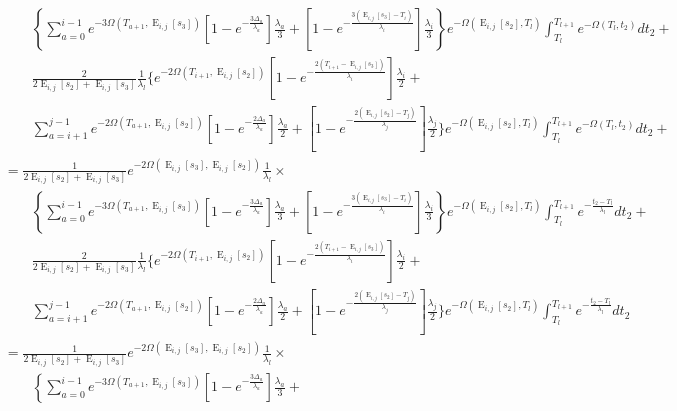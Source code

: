 \documentclass{article}
\DeclareMathOperator{\E}{E}
\begin{document}
\begin{align*}
    &\qquad\left\{\sum_{a=0}^{i-1}e^{-3\Omega(T_{a+1},\E_{i,j}[s_3])}
        \left[1-e^{-\frac{3\Delta_a}{\lambda_a}}\right]\frac{\lambda_a}{3}+
    \left[1-e^{-\frac{3\left(\E_{i,j}[s_3]-T_i\right)}{\lambda_i}}\right]
    \frac{\lambda_i}{3}\right\}
    e^{-\Omega(\E_{i,j}[s_2], T_l)}\int_{T_l}^{T_{l+1}}e^{-\Omega(T_l,t_2)}dt_2+\\
    &\qquad
        \frac{2}{2\E_{i,j}[s_2]+\E_{i,j}[s_3]}\frac{1}{\lambda_l}\Bigg\{e^{-2\Omega(T_{i+1},\E_{i,j}[s_2])}\left[1-e^{-\frac{2\left(T_{i+1}-\E_{i,j}[s_3]\right)}{\lambda_i}}\right]\frac{\lambda_i}{2}+\\
    &\qquad\sum_{a=i+1}^{j-1}e^{-2\Omega\left(T_{a+1},\E_{i,j}[s_2]\right)}\left[1-e^{-\frac{2\Delta_a}{\lambda_a}}\right]\frac{\lambda_a}{2}+
            \left[1-e^{-\frac{2\left(\E_{i,j}[s_2]-T_j\right)}{\lambda_j}}\right]\frac{\lambda_j}{2}
    \Bigg\}
    e^{-\Omega(\E_{i,j}[s_2], T_l)}\int_{T_l}^{T_{l+1}}e^{-\Omega(T_l,t_2)}dt_2+\\
    &=\frac{1}{2\E_{i,j}[s_2]+\E_{i,j}[s_3]}e^{-2\Omega(\E_{i,j}[s_3],\E_{i,j}[s_2])}\frac{1}{\lambda_l}\times\\
    &\qquad\left\{\sum_{a=0}^{i-1}e^{-3\Omega(T_{a+1},\E_{i,j}[s_3])}
        \left[1-e^{-\frac{3\Delta_a}{\lambda_a}}\right]\frac{\lambda_a}{3}+
    \left[1-e^{-\frac{3\left(\E_{i,j}[s_3]-T_i\right)}{\lambda_i}}\right]
    \frac{\lambda_i}{3}\right\}
    e^{-\Omega(\E_{i,j}[s_2], T_l)}\int_{T_l}^{T_{l+1}}e^{-\frac{t_2-T_l}{\lambda_l}}dt_2+\\
    &\qquad
        \frac{2}{2\E_{i,j}[s_2]+\E_{i,j}[s_3]}\frac{1}{\lambda_l}\Bigg\{e^{-2\Omega(T_{i+1},\E_{i,j}[s_2])}\left[1-e^{-\frac{2\left(T_{i+1}-\E_{i,j}[s_3]\right)}{\lambda_i}}\right]\frac{\lambda_i}{2}+\\
    &\qquad\sum_{a=i+1}^{j-1}e^{-2\Omega\left(T_{a+1},\E_{i,j}[s_2]\right)}\left[1-e^{-\frac{2\Delta_a}{\lambda_a}}\right]\frac{\lambda_a}{2}+
            \left[1-e^{-\frac{2\left(\E_{i,j}[s_2]-T_j\right)}{\lambda_j}}\right]\frac{\lambda_j}{2}
    \Bigg\}
    e^{-\Omega(\E_{i,j}[s_2], T_l)}\int_{T_l}^{T_{l+1}}e^{-\frac{t_2-T_l}{\lambda_l}}dt_2\\
    &=\frac{1}{2\E_{i,j}[s_2]+\E_{i,j}[s_3]}e^{-2\Omega(\E_{i,j}[s_3],\E_{i,j}[s_2])}\frac{1}{\lambda_l}\times\\
    &\qquad\left\{\sum_{a=0}^{i-1}e^{-3\Omega(T_{a+1},\E_{i,j}[s_3])}
        \left[1-e^{-\frac{3\Delta_a}{\lambda_a}}\right]\frac{\lambda_a}{3}+

\end{align*}
\end{document}
